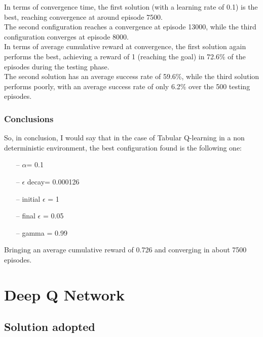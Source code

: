 \documentclass{article}
\begin{document}
\clearpage


In terms of convergence time, the first solution (with a learning rate of 0.1) is the best, reaching convergence at around episode 7500.
\\
The second configuration reaches a convergence at episode 13000, while the third configuration converges at episode 8000.
\\
In terms of average cumulative reward at convergence, the first solution again performs the best, achieving a reward of 1 (reaching the goal) in 72.6\% of the episodes during the testing phase.
\\
The second solution has an average success rate of 59.6\%, while the third solution performs poorly, with an average success rate of only 6.2\% over the 500 testing episodes.

\subsubsection{Conclusions}

So, in conclusion, I would say that in the case of Tabular Q-learning in a non deterministic environment, the best configuration found is the following one:
\begin{itemize}
\item[--] $\alpha$= 0.1
\item[--] $\epsilon$ decay= 0.000126
\item[--] initial $\epsilon$ = 1
\item[--] final $\epsilon$ = 0.05
\item[--] gamma = 0.99
\end{itemize}


Bringing an average cumulative reward of 0.726 and converging in about 7500 episodes.



\section{Deep Q Network}

\subsection{Solution adopted}
\end{document}
